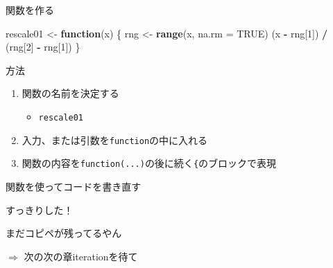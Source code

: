 \documentclass[ignorenonframetext,]{beamer}
\newenvironment{Shaded}{\begin{snugshade}}{\end{snugshade}}
\newcommand{\KeywordTok}[1]{\textcolor[rgb]{0.13,0.29,0.53}{\textbf{#1}}}
\newcommand{\DataTypeTok}[1]{\textcolor[rgb]{0.13,0.29,0.53}{#1}}
\newcommand{\DecValTok}[1]{\textcolor[rgb]{0.00,0.00,0.81}{#1}}
\newcommand{\StringTok}[1]{\textcolor[rgb]{0.31,0.60,0.02}{#1}}
\newcommand{\OtherTok}[1]{\textcolor[rgb]{0.56,0.35,0.01}{#1}}
\newcommand{\ControlFlowTok}[1]{\textcolor[rgb]{0.13,0.29,0.53}{\textbf{#1}}}
\newcommand{\OperatorTok}[1]{\textcolor[rgb]{0.81,0.36,0.00}{\textbf{#1}}}
\newcommand{\NormalTok}[1]{#1}
\providecommand{\tightlist}{%
  \setlength{\itemsep}{0pt}\setlength{\parskip}{0pt}}
\begin{document}
\begin{frame}[fragile]{関数を作る}

\begin{Shaded}
\begin{Highlighting}[]
\NormalTok{rescale01 <-}\StringTok{ }\ControlFlowTok{function}\NormalTok{(x) \{}
\NormalTok{  rng <-}\StringTok{ }\KeywordTok{range}\NormalTok{(x, }\DataTypeTok{na.rm =} \OtherTok{TRUE}\NormalTok{)}
\NormalTok{  (x }\OperatorTok{-}\StringTok{ }\NormalTok{rng[}\DecValTok{1}\NormalTok{]) }\OperatorTok{/}\StringTok{ }\NormalTok{(rng[}\DecValTok{2}\NormalTok{] }\OperatorTok{-}\StringTok{ }\NormalTok{rng[}\DecValTok{1}\NormalTok{])}
\NormalTok{\}}
\end{Highlighting}
\end{Shaded}

\begin{block}{方法}

\begin{enumerate}
\def\labelenumi{\arabic{enumi}.}
\tightlist
\item
  関数の名前を決定する

  \begin{itemize}
  \tightlist
  \item
    \texttt{rescale01}
  \end{itemize}
\item
  入力、または引数を\texttt{function}の中に入れる
\item
  関数の内容を\texttt{function(...)}の後に続く\texttt{\{}のブロックで表現
\end{enumerate}

\end{block}

\end{frame}

\begin{frame}[fragile]{関数を使ってコードを書き直す}

\begin{Shaded}
\end{Shaded}

すっきりした！

\begin{block}{まだコピペが残ってるやん}

\(\Rightarrow\) 次の次の章iterationを待て

\end{block}

\end{frame}
\end{document}
